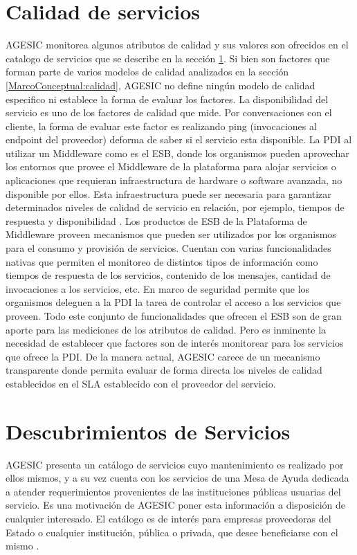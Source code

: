 \section{Calidad de servicios}
\label{Analisis:CalidadServicios}
AGESIC monitorea algunos atributos de calidad y sus valores son ofrecidos en el catalogo de servicios que se describe en la sección \ref{Analisis:CalidadServicios}. Si bien son factores que forman parte de varios modelos de calidad analizados en la sección \ref{MarcoConceptual:calidad}, AGESIC no define ningún modelo de calidad especifico ni establece la forma de evaluar los factores.
La disponibilidad del servicio es uno de los factores de calidad que mide. Por conversaciones con el cliente, la forma de evaluar este factor es realizando ping (invocaciones al endpoint del proveedor) deforma de saber si el servicio esta disponible.
La PDI al utilizar un Middleware como es el ESB, donde los organismos pueden aprovechar los entornos que provee el Middleware de la plataforma para alojar servicios o aplicaciones que requieran infraestructura de hardware o  software avanzada, no disponible por ellos. Esta infraestructura  puede ser necesaria para garantizar determinados niveles de calidad de  servicio en relación, por ejemplo, tiempos de respuesta y disponibilidad \cite{Agesic:GuiaUsos}.
Los productos de ESB de la Plataforma de Middleware proveen mecanismos que pueden ser utilizados por los organismos para el consumo y provisión de servicios. Cuentan con varias funcionalidades nativas que permiten el monitoreo de distintos tipos de información como tiempos de  respuesta de los servicios, contenido de los mensajes, cantidad de  invocaciones a los servicios, etc. En marco de seguridad permite que los organismos deleguen a la PDI la tarea de controlar el acceso a los servicios que proveen.
Todo este conjunto de funcionalidades que ofrecen el ESB son de gran aporte para las mediciones de los atributos de calidad. Pero es inminente la necesidad de establecer que factores son de interés monitorear para los servicios que ofrece la PDI. 
De la manera actual, AGESIC carece de un mecanismo transparente donde permita evaluar de forma directa los niveles de calidad establecidos en el SLA establecido con el proveedor del servicio.

\section{Descubrimientos de Servicios}
\label{Analisis:Catalogo}
AGESIC presenta un catálogo de servicios cuyo mantenimiento es realizado por ellos mismos, y a su vez cuenta con los servicios de una Mesa de Ayuda dedicada a atender requerimientos provenientes de las instituciones públicas usuarias del servicio. Es una motivación de AGESIC poner esta información a disposición de cualquier interesado. El catálogo es de  interés para empresas proveedoras del Estado o cualquier institución, pública o privada, que  desee beneficiarse con el mismo \cite{Agesic:Catalogo}.

